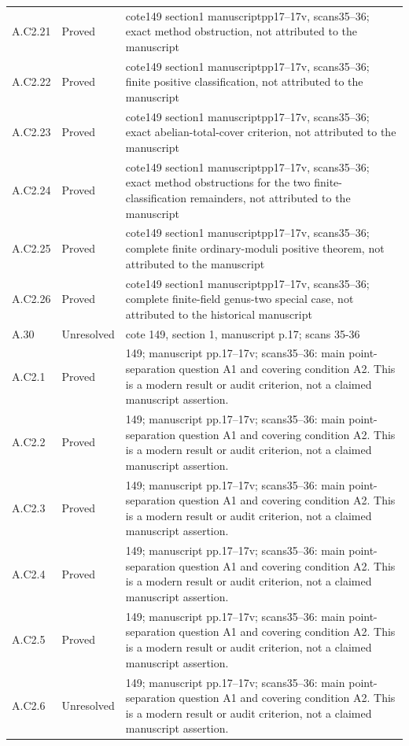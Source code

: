 {\begin{longtable}{p{1.9cm}p{1.7cm}p{10.3cm}}
A.C2.21 & Proved & cote149 section1 manuscriptpp17–17v, scans35–36; exact method obstruction, not attributed to the manuscript \\
A.C2.22 & Proved & cote149 section1 manuscriptpp17–17v, scans35–36; finite positive classification, not attributed to the manuscript \\
A.C2.23 & Proved & cote149 section1 manuscriptpp17–17v, scans35–36; exact abelian-total-cover criterion, not attributed to the manuscript \\
A.C2.24 & Proved & cote149 section1 manuscriptpp17–17v, scans35–36; exact method obstructions for the two finite-classification remainders, not attributed to the manuscript \\
A.C2.25 & Proved & cote149 section1 manuscriptpp17–17v, scans35–36; complete finite ordinary-moduli positive theorem, not attributed to the manuscript \\
A.C2.26 & Proved & cote149 section1 manuscriptpp17–17v, scans35–36; complete finite-field genus-two special case, not attributed to the historical manuscript \\
A.30 & Unresolved & cote 149, section 1, manuscript p.17; scans 35-36 \\
A.C2.1 & Proved & 149; manuscript pp.17–17v; scans35–36: main point-separation question A1 and covering condition A2. This is a modern result or audit criterion, not a claimed manuscript assertion. \\
A.C2.2 & Proved & 149; manuscript pp.17–17v; scans35–36: main point-separation question A1 and covering condition A2. This is a modern result or audit criterion, not a claimed manuscript assertion. \\
A.C2.3 & Proved & 149; manuscript pp.17–17v; scans35–36: main point-separation question A1 and covering condition A2. This is a modern result or audit criterion, not a claimed manuscript assertion. \\
A.C2.4 & Proved & 149; manuscript pp.17–17v; scans35–36: main point-separation question A1 and covering condition A2. This is a modern result or audit criterion, not a claimed manuscript assertion. \\
A.C2.5 & Proved & 149; manuscript pp.17–17v; scans35–36: main point-separation question A1 and covering condition A2. This is a modern result or audit criterion, not a claimed manuscript assertion. \\
A.C2.6 & Unresolved & 149; manuscript pp.17–17v; scans35–36: main point-separation question A1 and covering condition A2. This is a modern result or audit criterion, not a claimed manuscript assertion. \\

\end{longtable}}
